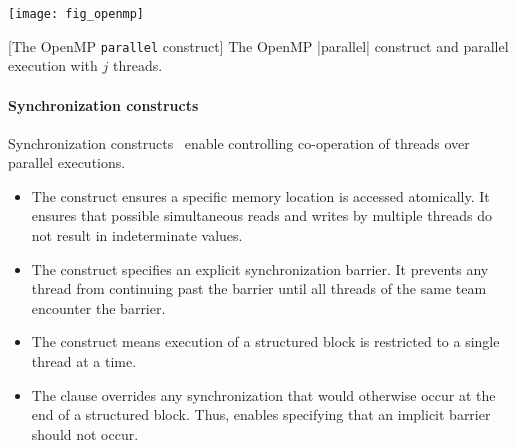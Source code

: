 \begin{center}
\captionsetup{type=lstlisting}
\begin{minipage}{.45\textwidth}
\end{minipage}\hfill%
\begin{minipage}{.5\textwidth}
\hfill\texttt{[image: fig\_openmp]}
\end{minipage}
[The OpenMP \texttt{parallel} construct]{
The OpenMP \pr|parallel| construct and parallel execution with \(j\) threads.%
}\label{lst:parallel}
\end{center}

\paragraph*{Synchronization constructs}
Synchronization constructs~\cite[p. 473--482]{openmp_api} enable controlling co-operation of threads over parallel executions.

\begin{itemize}

\item The  construct ensures a specific memory location is accessed atomically.
It ensures that possible simultaneous reads and writes by multiple threads do not result in indeterminate values.

\item The  construct specifies an explicit synchronization barrier.
It prevents any thread from continuing past the barrier until all threads of the same team encounter the barrier.

\item The  construct means execution of a structured block is restricted to a single thread at a time.

\item The  clause overrides any synchronization that would otherwise occur at the end of a structured block.
Thus,  enables specifying that an implicit barrier should not occur.

\end{itemize}

